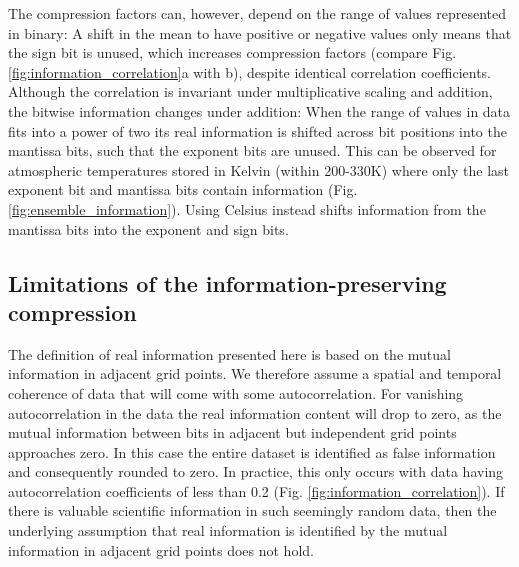 The compression factors can, however, depend on the range of values represented in binary: A shift in the mean to have
positive or negative values only means that the sign bit is unused, which increases compression factors
(compare Fig. \ref{fig:information_correlation}a with b), despite identical correlation coefficients. Although the correlation
is invariant under multiplicative scaling and addition, the bitwise information changes under addition: When the range of
values in data fits into a power of two its real information is shifted across bit positions into the mantissa bits, such that
the exponent bits are unused. This can be observed for atmospheric temperatures stored in Kelvin (within 200-330K)
where only the last exponent bit and mantissa bits contain information (Fig. \ref{fig:ensemble_information}).
Using Celsius instead shifts information from the mantissa bits into the exponent and sign bits.

\subsection{Limitations of the information-preserving compression}

The definition of real information presented here is based on the mutual information in adjacent grid points.
We therefore assume a spatial and temporal coherence of data that will come with some autocorrelation.
For vanishing autocorrelation in the data the real information content will drop to zero, as the mutual information
between bits in adjacent but independent grid points approaches zero. In this case the entire dataset is identified
as false information and consequently rounded to zero. In practice, this only occurs with data having autocorrelation
coefficients of less than 0.2 (Fig. \ref{fig:information_correlation}). If there is valuable scientific information in such
seemingly random data, then the underlying assumption that real information is identified by the mutual information
in adjacent grid points does not hold. 

